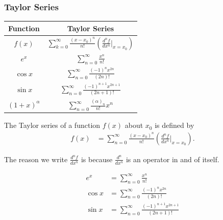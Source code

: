 \documentclass[10pt]{mypackage}
\begin{document}
\subsubsection{Taylor Series}%
\begin{center}
  \renewcommand{\arraystretch}{1.5}
  \begin{tabular}{c|c}
    Function & Taylor Series\\
    \hline\hline
    $f(x)$ & $ \sum_{k=0}^{\infty}\frac{\left(x-x_0\right)^n}{n!}\left(\frac{d^{n}f}{dx^n}\biggr\vert_{x=x_0}\right)$\\
    $e^x$ & $\sum_{n=0}^{\infty}\frac{x^n}{n!}$\\
    $\cos x$ & $\sum_{n=0}^{\infty}\frac{\left(-1\right)^nx^{2n}}{\left(2n\right)!}$\\
    $\sin x$ & $\sum_{n=0}^{\infty}\frac{\left(-1\right)^{n+1}x^{2n+1}}{\left(2n+1\right)!}$\\
    $\left(1 + x\right)^{\alpha}$ & $\sum_{n=0}^{\infty}\frac{\left(\alpha\right)_{n}}{n!}x^n$\footnotemark
  \end{tabular}
\end{center}
\begin{definition}
  The Taylor series of a function $f(x)$ about $x_0$ is defined by
  \begin{align*}
    f(x) &= \sum_{n=0}^{\infty}\frac{\left(x-x_0\right)^n}{n!}\left(\frac{d^nf}{dx^n}\biggr\vert_{x=x_0}\right).
  \end{align*}
\end{definition}
\begin{remark}
  The reason we write $\frac{d^nf}{dx^n}$ is because $\frac{d^n}{dx^n}$ is an operator in and of itself.
\end{remark}
\begin{example}
  \begin{align*}
    e^x &= \sum_{n=0}^{\infty}\frac{x^n}{n!}\\
    \cos x &= \sum_{n=0}^{\infty}\frac{\left(-1\right)^nx^{2n}}{\left(2n\right)!}\\
    \sin x &= \sum_{n=0}^{\infty}\frac{\left(-1\right)^{n+1}x^{2n+1}}{\left(2n+1\right)!}
  \end{align*}
\end{example}
\end{document}
